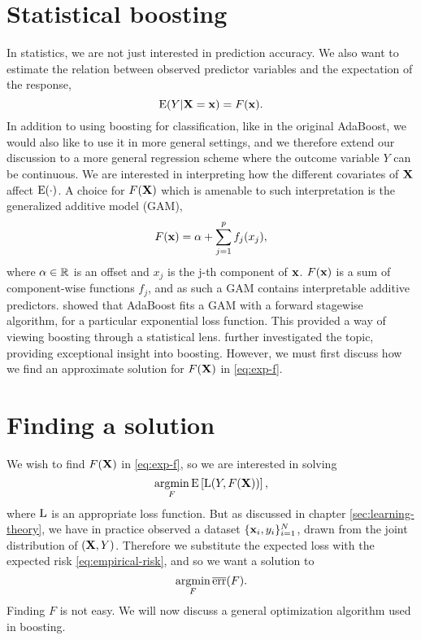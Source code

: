 \section{Statistical boosting}\label{sec:sboost}
In statistics, we are not just interested in prediction accuracy.  We also want to estimate the relation between observed predictor variables and the expectation of the response,
\begin{equation}\label{eq:exp-f}
    \operatorname{E}(Y|\mathbf{X}=\mathbf{x})=F(\mathbf{x}).
\end{equation}
In addition to using boosting for classification, like in the original AdaBoost, we would also like to use it in more general settings, and we therefore extend our discussion to a more general regression scheme where the outcome variable $Y$ can be continuous. We are interested in interpreting how the different covariates of $\mathbf{X}$ affect $\operatorname{E}(\cdot)$. A choice for $F(\mathbf{X})$ which is amenable to such interpretation is the generalized additive model (GAM),
\begin{equation}\label{eq:gam}
    F(\mathbf{x})=\alpha+\sum_{j=1}^pf_j(x_j),
\end{equation}
where $\alpha\in\mathbb{R}$ is an offset and $x_j$ is the j-th component of $\mathbf{x}$. $F(\mathbf{x})$ is a sum of component-wise functions $f_j$, and as such a GAM contains interpretable additive predictors. \cite{friedman2000} showed that AdaBoost fits a GAM with a forward stagewise algorithm, for a particular exponential loss function. This provided a way of viewing boosting through a statistical lens. \cite{friedman2001} further investigated the topic, providing exceptional insight into boosting. However, we must first discuss how we find an approximate solution for $F(\mathbf{X})$ in \eqref{eq:exp-f}.

\section{Finding a solution}
We wish to find $F(\mathbf{X})$ in \eqref{eq:exp-f}, so we are interested in solving
\begin{equation*}
    \operatorname*{argmin}_{F}\operatorname{E}\left[\operatorname{L}(Y,F(\mathbf{X}))\right],
\end{equation*}
where $\operatorname{L}$ is an appropriate loss function. But as discussed in chapter \ref{sec:learning-theory}, we have in practice observed a dataset $\{\mathbf{x}_i,y_i\}_{i=1}^N$, drawn from the joint distribution of $(\mathbf{X},Y)$. Therefore we substitute the expected loss with the expected risk \eqref{eq:empirical-risk}, and so we want a solution to
\begin{equation}\label{eq:argmin-risk}
    \operatorname*{argmin}_{F}\overline{\text{err}}(F).
\end{equation}
Finding $F$ is not easy. We will now discuss a general optimization algorithm used in boosting.


